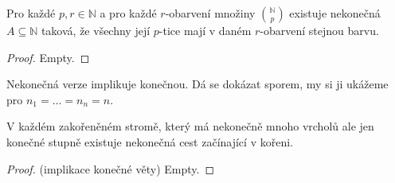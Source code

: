 \begin{veta}
	Pro každé $p,r \in \mathbb{N}$ a pro každé $r$-obarvení množiny $\binom{\mathbb{N}}{p}$ existuje nekonečná $A \subseteq \mathbb{N}$ taková, že všechny její $p$-tice mají v daném $r$-obarvení stejnou barvu.
\end{veta}

\begin{proof}
	Empty.
\end{proof}

Nekonečná verze implikuje konečnou. Dá se dokázat sporem, my si ji ukážeme pro $n_{1} = \dots = n_{n} = n$.

\begin{lemma}
	V každém zakořeněném stromě, který má nekonečně mnoho vrcholů ale jen konečné stupně existuje nekonečná cest začínající v kořeni.
\end{lemma}

\begin{proof}(implikace konečné věty)
	Empty.
\end{proof}
